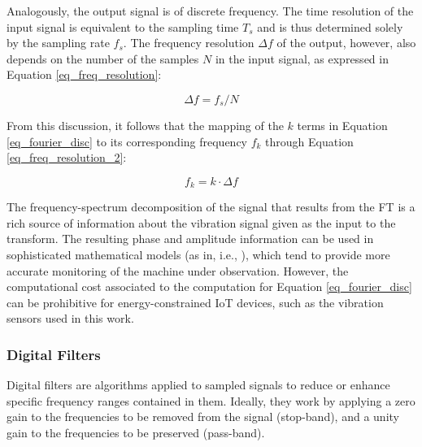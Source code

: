 \documentclass[conference]{IEEEtran}
\begin{document}
Analogously, the output signal is of discrete frequency. The time resolution of the input signal is equivalent to the sampling time $T_{s}$ and is thus determined solely by the sampling rate $f_{s}$. The frequency resolution $\Delta f$ of the output, however, also depends on the number of the samples $N$ in the input signal, as expressed in Equation \ref{eq_freq_resolution}:

\begin{equation}
\label{eq_freq_resolution}
\Delta f = f_{s}/N
\end{equation}

From this discussion, it follows that the mapping of the $k$ terms in Equation \ref{eq_fourier_disc} to its corresponding frequency $f_{k}$ through Equation \ref{eq_freq_resolution_2}:

\begin{equation}
\label{eq_freq_resolution_2}
f_{k} = k \cdot \Delta f
\end{equation}

The frequency-spectrum decomposition of the signal that results from the FT is a rich source of information about the vibration signal given as the input to the transform. The resulting phase and amplitude information can be used in sophisticated mathematical models (as in, i.e., \cite{wu2017remaining}), which tend to provide more accurate monitoring of the machine under observation. However, the computational cost associated to the computation for Equation \ref{eq_fourier_disc} can be prohibitive for energy-constrained IoT devices, such as the vibration sensors used in this work. 


\subsubsection{Digital Filters}
\label{sec_digital_filters_concept}
Digital filters are algorithms applied to sampled signals to reduce or enhance specific frequency ranges contained in them. Ideally, they work by applying a zero gain to the frequencies to be removed from the signal (stop-band), and a unity gain to the frequencies to be preserved (pass-band).

\end{document}
